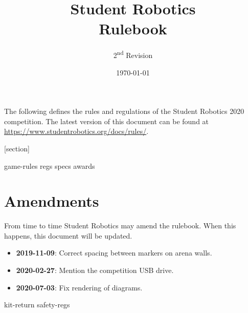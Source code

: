 \documentclass[a4paper, 11pt]{scrartcl}
\title {Student Robotics \sryear\\ Rulebook}
\author{2\textsuperscript{nd} Revision}
\date{\today}
\newcommand{\sryear}{2020}
\begin{document}
\maketitle

\noindent The following defines the rules and regulations of the Student Robotics \sryear {} competition.  The latest version of this document can be found at \url{https://www.studentrobotics.org/docs/rules/}.

[section]
\newcommand{\rcn}{\stepcounter{rule}\arabic{section}.\arabic{rule}}
\newcommand{\rcnappendix}{\stepcounter{rule}\Alph{section}.\arabic{rule}}
\renewcommand{\labelenumi}{\rcn}

 {game-rules}
\newpage
 {regs}
\newpage
 {specs}
\newpage
 {awards}

\renewcommand{\labelenumi}{\rcn}

\section{Amendments}
From time to time Student Robotics may amend the rulebook.  When this happens, this document will be updated.

\begin{itemize}
\item \textbf{2019-11-09}: Correct spacing between markers on arena walls.
\item \textbf{2020-02-27}: Mention the competition USB drive.
\item \textbf{2020-07-03}: Fix rendering of diagrams.
\end{itemize}

\newpage
\appendix
\renewcommand{\labelenumi}{\rcnappendix}
\appendixpage
\addappheadtotoc
 {kit-return}
 {safety-regs}
\end{document}
